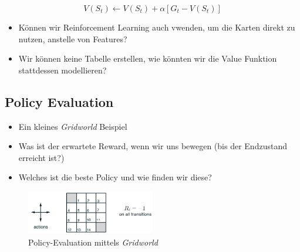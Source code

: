 \documentclass[a4paper]{article}
\begin{document}
		$$ V(S_t) \leftarrow V(S_t) + \alpha \left[ G_t - V(S_t) \right] $$
		
		\begin{itemize}
			\item Können wir Reinforcement Learning auch vwenden, um die Karten direkt zu nutzen, anstelle von Features?
			\item Wir können keine Tabelle erstellen, wie könnten wir die Value Funktion stattdessen modellieren?
		\end{itemize}
	
		\newpage
	
		\subsection{Policy Evaluation}
		
		\begin{itemize}
			\item Ein kleines \textit{Gridworld} Beispiel
			\item Was ist der erwartete Reward, wenn wir uns bewegen (bis der Endzustand erreicht ist?)
			\item Welches ist die beste Policy und wie finden wir diese?
		\end{itemize}
	
		\begin{figure}[htb!]
			\centering
			\includegraphics[width=0.5\textwidth]{img/08_reinforcement_learning/policy_eval_gridworld.png}
			\caption{Policy-Evaluation mittels \textit{Gridworld}}
		\end{figure}
	
\end{document}
